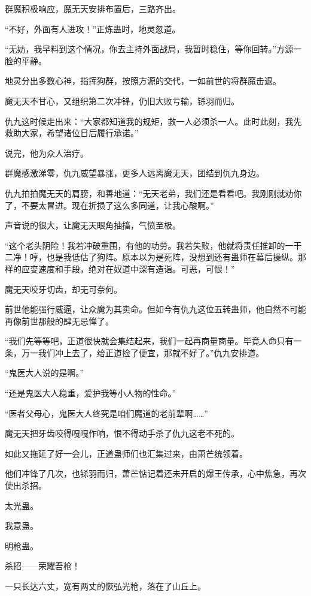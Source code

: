 \begin{this_body}
群魔积极响应，魔无天安排布置后，三路齐出。

“不好，外面有人进攻！”正炼蛊时，地灵忽道。

“无妨，我早料到这个情况，你去主持外面战局，我暂时稳住，等你回转。”方源一脸的平静。

地灵分出多数心神，指挥狗群，按照方源的交代，一如前世的将群魔击退。

魔无天不甘心，又组织第二次冲锋，仍旧大败亏输，铩羽而归。

仇九这时候走出来：“大家都知道我的规矩，救一人必须杀一人。此时此刻，我先救助大家，希望诸位日后履行承诺。”

说完，他为众人治疗。

群魔感激涕零，仇九威望暴涨，更多人远离魔无天，团结到仇九身边。

仇九拍拍魔无天的肩膀，和善地道：“无天老弟，我们还是看看吧。我刚刚就劝你了，不要太冒进。现在折损了这么多同道，让我心酸啊。”

声音说的很大，让魔无天眼角抽搐，气愤至极。

“这个老头阴险！我若冲破重围，有他的功劳。我若失败，他就将责任推卸的一干二净！哼，也是我低估了狗阵。原本以为是死阵，没想到还有蛊师在幕后操纵。那样的应变速度和手段，绝对在奴道中深有造诣。可恶，可恨！”

魔无天咬牙切齿，却无可奈何。

前世他能强行威逼，让众魔为其卖命。但如今有仇九这位五转蛊师，他自然不可能再像前世那般的肆无忌惮了。

“我们先等等吧，正道很快就会集结起来，我们一起再商量商量。毕竟人命只有一条，万一我们冲上去了，给正道捡了便宜，那就不好了。”仇九安排道。

“鬼医大人说的是啊。”

“还是鬼医大人稳重，爱护我等小人物的性命。”

“医者父母心，鬼医大人终究是咱们魔道的老前辈啊……”

魔无天把牙齿咬得嘎嘎作响，恨不得动手杀了仇九这老不死的。

如此又拖延了好一会儿，正道蛊师们也汇集过来，由萧芒统领着。

他们冲锋了几次，也铩羽而归，萧芒惦记着还未开启的爆王传承，心中焦急，再次使出杀招。

太光蛊。

我意蛊。

明枪蛊。

杀招——荣耀吾枪！

一只长达六丈，宽有两丈的恢弘光枪，落在了山丘上。


\end{this_body}
